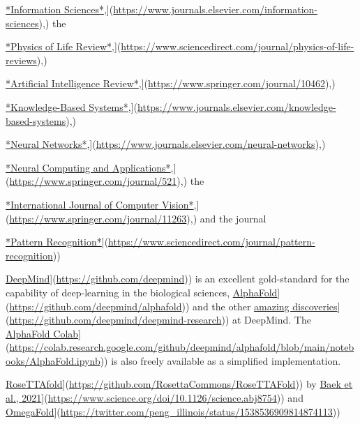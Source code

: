 \documentclass[
]{book}
\begin{document}
\href{\%5Bhttps://www.journals.elsevier.com/information-sciences}{*Information Sciences*},{]}(\url{https://www.journals.elsevier.com/information-sciences}),) the

\href{\%5Bhttps://www.sciencedirect.com/journal/physics-of-life-reviews}{*Physics of Life Review*},{]}(\url{https://www.sciencedirect.com/journal/physics-of-life-reviews}),)

\href{\%5Bhttps://www.springer.com/journal/10462}{*Artificial Intelligence Review*},{]}(\url{https://www.springer.com/journal/10462}),)

\href{\%5Bhttps://www.journals.elsevier.com/knowledge-based-systems}{*Knowledge-Based Systems*},{]}(\url{https://www.journals.elsevier.com/knowledge-based-systems}),)

\href{\%5Bhttps://www.journals.elsevier.com/neural-networks}{*Neural Networks*},{]}(\url{https://www.journals.elsevier.com/neural-networks}),)

\href{\%5Bhttps://www.springer.com/journal/521}{*Neural Computing and Applications*},{]}(\url{https://www.springer.com/journal/521}),) the

\href{\%5Bhttps://www.springer.com/journal/11263}{*International Journal of Computer Vision*},{]}(\url{https://www.springer.com/journal/11263}),) and the journal

\href{\%5Bhttps://www.sciencedirect.com/journal/pattern-recognition}{*Pattern Recognition*}{]}(\url{https://www.sciencedirect.com/journal/pattern-recognition}))

\href{\%5Bhttps://github.com/deepmind}{DeepMind}{]}(\url{https://github.com/deepmind})) is an excellent gold-standard for the capability of deep-learning in the biological sciences, \href{\%5Bhttps://github.com/deepmind/alphafold}{AlphaFold}{]}(\url{https://github.com/deepmind/alphafold})) and the other \href{\%5Bhttps://github.com/deepmind/deepmind-research}{amazing discoveries}{]}(\url{https://github.com/deepmind/deepmind-research})) at DeepMind. The \href{\%5Bhttps://colab.research.google.com/github/deepmind/alphafold/blob/main/notebooks/AlphaFold.ipynb}{AlphaFold Colab}{]}(\url{https://colab.research.google.com/github/deepmind/alphafold/blob/main/notebooks/AlphaFold.ipynb})) is also freely available as a simplified implementation.

\href{\%5Bhttps://github.com/RosettaCommons/RoseTTAFold}{RoseTTAfold}{]}(\url{https://github.com/RosettaCommons/RoseTTAFold})) by \href{\%5Bhttps://www.science.org/doi/10.1126/science.abj8754}{Baek et al., 2021}{]}(\url{https://www.science.org/doi/10.1126/science.abj8754})) and \href{\%5Bhttps://twitter.com/peng_illinois/status/1538536909814874113}{OmegaFold}{]}(\url{https://twitter.com/peng_illinois/status/1538536909814874113}))
\end{document}
